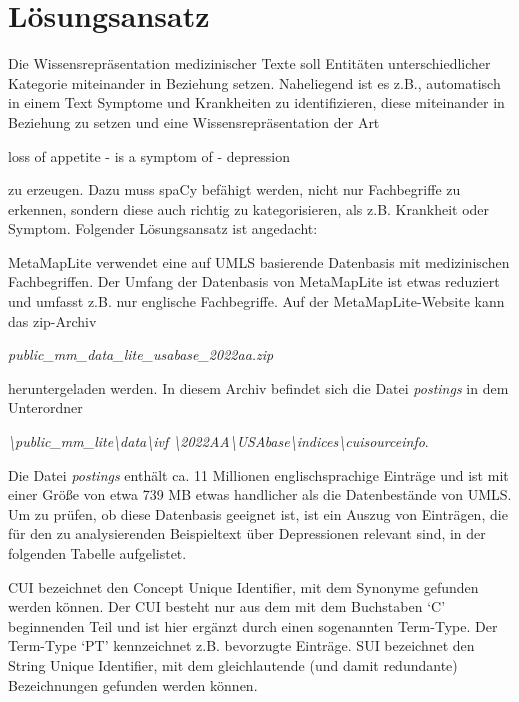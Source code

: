 \chapter{Lösungsansatz}

Die Wissensrepräsentation medizinischer Texte soll Entitäten unterschiedlicher Kategorie miteinander in Beziehung setzen. Naheliegend ist es z.B., automatisch in einem Text Symptome und Krankheiten zu identifizieren, diese miteinander in Beziehung zu setzen und eine Wissensrepräsentation der Art

\begin{center}
loss of appetite - is a symptom of - depression
\end{center}

zu erzeugen. Dazu muss spaCy befähigt werden, nicht nur Fachbegriffe zu erkennen, sondern diese auch richtig zu kategorisieren, als z.B. Krankheit oder Symptom. Folgender Lösungsansatz ist angedacht:

MetaMapLite verwendet eine auf UMLS basierende Datenbasis mit medizinischen Fachbegriffen. Der Umfang der Datenbasis von MetaMapLite ist etwas reduziert und umfasst z.B. nur englische Fachbegriffe. Auf der MetaMapLite-Website kann das zip-Archiv

\begin{center}
\emph{public\_mm\_data\_lite\_usabase\_2022aa.zip}
\end{center}

heruntergeladen werden. In diesem Archiv befindet sich die Datei \emph{postings} in dem Unterordner

\begin{center}
\emph{\textbackslash public\_mm\_lite\textbackslash data\textbackslash ivf \textbackslash 2022AA\textbackslash USAbase\textbackslash indices\textbackslash cuisourceinfo}.
\end{center}

Die Datei \emph{postings} enthält ca. 11 Millionen englischsprachige Einträge und ist mit einer Größe von etwa 739 MB etwas handlicher als die Datenbestände von UMLS. Um zu prüfen, ob diese Datenbasis geeignet ist, ist ein Auszug von Einträgen, die für den zu analysierenden Beispieltext über Depressionen relevant sind, in der folgenden Tabelle aufgelistet.

CUI bezeichnet den Concept Unique Identifier, mit dem Synonyme gefunden werden können. Der CUI besteht nur aus dem mit dem Buchstaben `C' beginnenden Teil und ist hier ergänzt durch einen sogenannten Term-Type. Der Term-Type `PT' kennzeichnet z.B. bevorzugte Einträge. SUI bezeichnet den String Unique Identifier, mit dem gleichlautende (und damit redundante) Bezeichnungen gefunden werden können.

